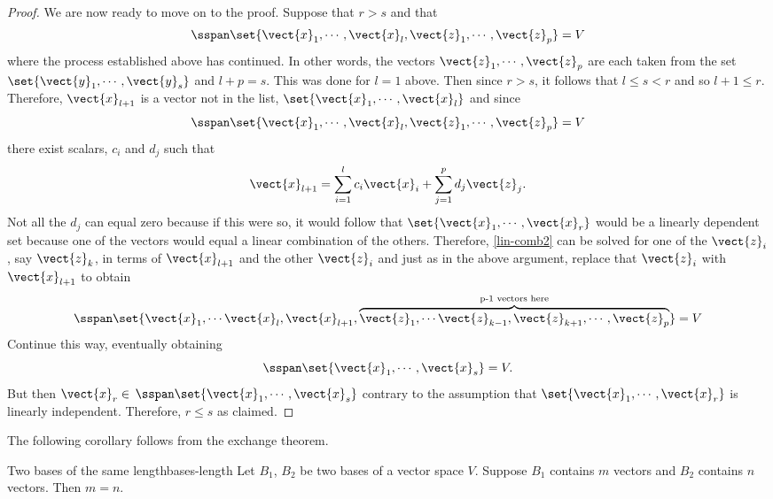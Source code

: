 \begin{proof}
We are now ready to move on to the proof. Suppose that $r>s$ and that 
\[
\sspan\set{\vect{x}_{1},\cdots ,
\vect{x}_{l},\vect{z}_{1},\cdots ,\vect{z}_{p}} =V
\]
 where the process established above has continued. In other words, the vectors $\vect{z}_{1},\cdots ,\vect{z}_{p}$ are each taken from the
set $\set{\vect{y}_{1},\cdots ,\vect{y}_{s}} $ and $l+p=s$.
This was done for $l=1$ above. Then since $r>s$, it follows that $
l\leq s<r$ and so $l+1\leq r$. Therefore, $\vect{x}_{l+1}$ is a vector not
in the list, $\set{\vect{x}_{1},\cdots ,\vect{x}_{l}} $ and
since 
\[
\sspan\set{\vect{x}_{1},\cdots ,\vect{x}_{l},\vect{z}
_{1},\cdots ,\vect{z}_{p}} =V
\]
 there exist scalars, $c_{i}$ and $
d_{j}$ such that 
\begin{equation}
\vect{x}_{l+1}=\sum_{i=1}^{l}c_{i}\vect{x}_{i}+\sum_{j=1}^{p}d_{j}
\vect{z}_{j}.  \label{lin-comb2}
\end{equation}
Not all the $d_{j}$ can equal zero because if this were so, it would follow
that $\set{\vect{x}_{1},\cdots ,\vect{x}_{r}} $ would be a
linearly dependent set because one of the vectors would equal a linear
combination of the others. Therefore, {\eqref{lin-comb2}} can be solved for one of the 
$\vect{z}_{i}$, say $\vect{z}_{k}$, in terms of $\vect{x}_{l+1}$ and
the other $\vect{z}_{i}$ and just as in the above argument, replace that $
\vect{z}_{i}$ with $\vect{x}_{l+1}$ to obtain 
\begin{equation*}
\sspan\set{\vect{x}_{1},\cdots \vect{x}_{l},\vect{x}_{l+1},
\overset{\text{p-1 vectors here}}{\overbrace{\vect{z}_{1},\cdots \vect{z}
_{k-1},\vect{z}_{k+1},\cdots ,\vect{z}_{p}}}} =V
\end{equation*}
Continue this way, eventually obtaining 
\begin{equation*}
\sspan\set{\vect{x}_{1},\cdots ,\vect{x}_{s}} =V.
\end{equation*}
But then $\vect{x}_{r}\in $ $\sspan\set{\vect{x}_{1},\cdots ,
\vect{x}_{s}} $ contrary to the assumption that $\set{\vect{x}
_{1},\cdots ,\vect{x}_{r}} $ is linearly independent. Therefore, $
r\leq s$ as claimed.
\end{proof}

The following corollary follows from the exchange theorem.

\begin{corollary}{Two bases of the same length}{bases-length}
Let $B_1$, $B_2$ be two bases of a vector space $V$. Suppose $B_1$ contains $m$ vectors and $B_2$ contains $n$ vectors. Then $m = n$.
\end{corollary}

